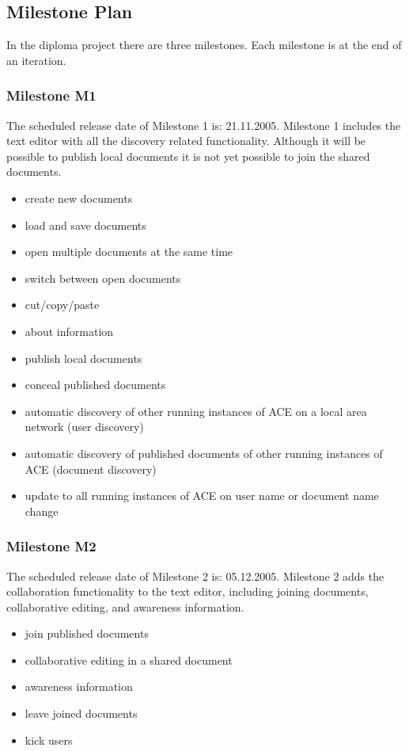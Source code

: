 \documentclass[11pt,a4paper]{article}
\begin{document}
\subsection{Milestone Plan}
\label{sect:Milestone Plan}

In the diploma project there are three milestones. Each milestone is at the end of an iteration.

\subsubsection{Milestone M1}

The scheduled release date of Milestone 1 is: 21.11.2005. Milestone 1 includes the text editor with
all the discovery related functionality. Although it will be possible to publish local documents
it is not yet possible to join the shared documents.

\begin{itemize}
 \item create new documents
 \item load and save documents
 \item open multiple documents at the same time
 \item switch between open documents
 \item cut/copy/paste
 \item about information
 \item publish local documents
 \item conceal published documents
 \item automatic discovery of other running instances of ACE on a local area network (user discovery)
 \item automatic discovery of published documents of other running instances of ACE (document discovery)
 \item update to all running instances of ACE on user name or document name change
\end{itemize}

\subsubsection{Milestone M2}

The scheduled release date of Milestone 2 is: 05.12.2005. Milestone 2 adds the collaboration functionality
to the text editor, including joining documents, collaborative editing, and awareness information.

\begin{itemize}
 \item join published documents
 \item collaborative editing in a shared document
 \item awareness information
 \item leave joined documents
 \item kick users
\end{itemize}
\end{document}
